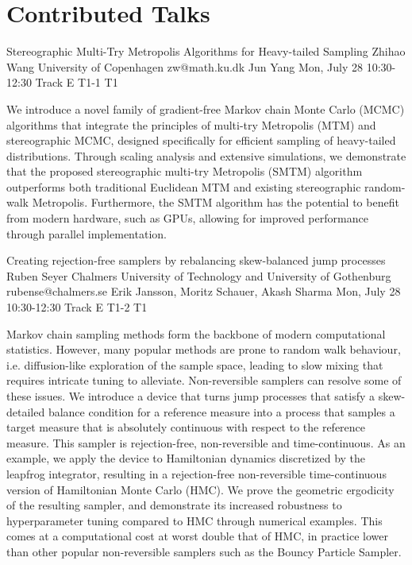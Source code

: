 \chapter{Contributed Talks}
\newpage

\begin{talk}
  {Stereographic Multi-Try Metropolis Algorithms for Heavy-tailed Sampling}%
  {Zhihao Wang}%
  {University of Copenhagen}%
  {zw@math.ku.dk}%
  {Jun Yang}%
  {}%
  {Mon, July 28 10:30-12:30 Track E}%
  {T1-1}%
  {T1}%
			
We introduce a novel family of gradient-free Markov chain Monte Carlo (MCMC) algorithms that integrate the principles of multi-try Metropolis (MTM) and stereographic MCMC, designed specifically for efficient sampling of heavy-tailed distributions. Through scaling analysis and extensive simulations, we demonstrate that the proposed stereographic multi-try Metropolis (SMTM) algorithm outperforms both traditional Euclidean MTM and existing stereographic random-walk Metropolis. Furthermore, the SMTM algorithm has the potential to benefit from modern hardware, such as GPUs, allowing for improved performance through parallel implementation.
\end{talk}
\begin{talk}
  {Creating rejection-free samplers by rebalancing skew-balanced jump processes}%
  {Ruben Seyer}%
  {Chalmers University of Technology and University of Gothenburg}%
  {rubense@chalmers.se}%
  {Erik Jansson, Moritz Schauer, Akash Sharma}%
  {}%
  {Mon, July 28 10:30-12:30 Track E}%
  {T1-2}%
  {T1}%
			
Markov chain sampling methods form the backbone of modern computational statistics.
However, many popular methods are prone to random walk behaviour, i.e.\@{} diffusion-like exploration of the sample space, leading to slow mixing that requires intricate tuning to alleviate.
Non-reversible samplers can resolve some of these issues.
We introduce a device that turns jump processes that satisfy a skew-detailed balance condition for a reference measure into a process that samples a target measure that is absolutely continuous with respect to the reference measure.
This sampler is rejection-free, non-reversible and time-continuous.
As an example, we apply the device to Hamiltonian dynamics discretized by the leapfrog integrator, resulting in a rejection-free non-reversible time-continuous version of Hamiltonian Monte Carlo (HMC).
We prove the geometric ergodicity of the resulting sampler, and demonstrate its increased robustness to hyperparameter tuning compared to HMC through numerical examples.
This comes at a computational cost at worst double that of HMC, in practice lower than other popular non-reversible samplers such as the Bouncy Particle Sampler.
\end{talk}
